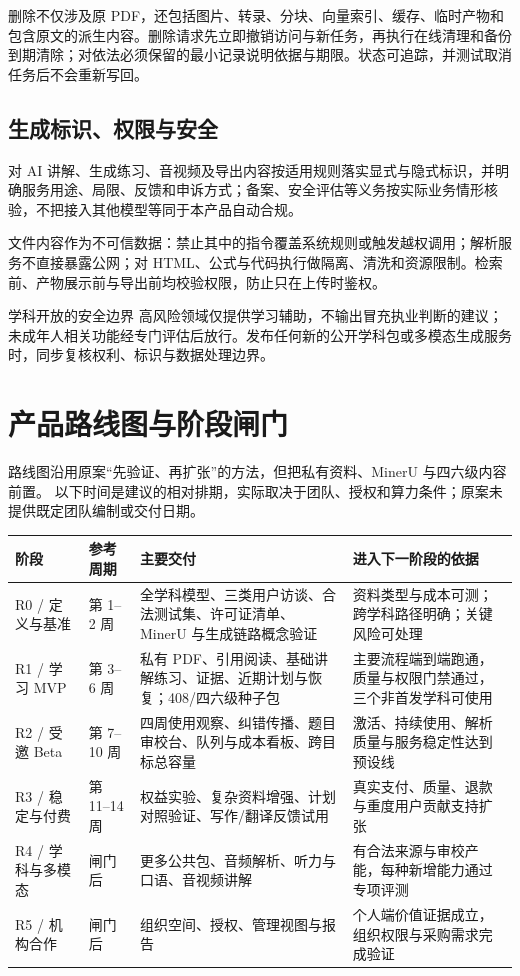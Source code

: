 \documentclass[UTF8,a4paper,11pt,fontset=none]{ctexart}
\newcommand{\cth}[1]{\textbf{\sffamily #1}}
\newcommand{\newsec}[1]{\clearpage\section{#1}}
\newenvironment{tbl}{\par\vspace{3pt}\small\noindent\ignorespaces}{\unskip\par\vspace{5pt}}
\begin{document}
删除不仅涉及原 PDF，还包括图片、转录、分块、向量索引、缓存、临时产物和包含原文的派生内容。删除请求先立即撤销访问与新任务，再执行在线清理和备份到期清除；对依法必须保留的最小记录说明依据与期限。状态可追踪，并测试取消任务后不会重新写回。

\subsection{生成标识、权限与安全}
对 AI 讲解、生成练习、音视频及导出内容按适用规则落实显式与隐式标识，并明确服务用途、局限、反馈和申诉方式；备案、安全评估等义务按实际业务情形核验，不把接入其他模型等同于本产品自动合规。\cite{genai,marking}

文件内容作为不可信数据：禁止其中的指令覆盖系统规则或触发越权调用；解析服务不直接暴露公网；对 HTML、公式与代码执行做隔离、清洗和资源限制。检索前、产物展示前与导出前均校验权限，防止只在上传时鉴权。

\begin{caution}{学科开放的安全边界}
高风险领域仅提供学习辅助，不输出冒充执业判断的建议；未成年人相关功能经专门评估后放行。发布任何新的公开学科包或多模态生成服务时，同步复核权利、标识与数据处理边界。
\end{caution}

\newsec{产品路线图与阶段闸门}
路线图沿用原案“先验证、再扩张”的方法，但把私有资料、MinerU 与四六级内容前置。\cite{original} 以下时间是建议的相对排期，实际取决于团队、授权和算力条件；原案未提供既定团队编制或交付日期。

\begin{tbl}
\begin{tabularx}{\linewidth}{@{}L{22mm}L{18mm}YY@{}}
\toprule
\cth{阶段}&\cth{参考周期}&\cth{主要交付}&\cth{进入下一阶段的依据}\\\midrule
R0 / 定义与基准&第 1--2 周&全学科模型、三类用户访谈、合法测试集、许可证清单、MinerU 与生成链路概念验证&资料类型与成本可测；跨学科路径明确；关键风险可处理\\
R1 / 学习 MVP&第 3--6 周&私有 PDF、引用阅读、基础讲解练习、证据、近期计划与恢复；408/四六级种子包&主要流程端到端跑通，质量与权限门禁通过，三个非首发学科可使用\\
R2 / 受邀 Beta&第 7--10 周&四周使用观察、纠错传播、题目审校台、队列与成本看板、跨目标总容量&激活、持续使用、解析质量与服务稳定性达到预设线\\
R3 / 稳定与付费&第 11--14 周&权益实验、复杂资料增强、计划对照验证、写作/翻译反馈试用&真实支付、质量、退款与重度用户贡献支持扩张\\
R4 / 学科与多模态&闸门后&更多公共包、音频解析、听力与口语、音视频讲解&有合法来源与审校产能，每种新增能力通过专项评测\\
R5 / 机构合作&闸门后&组织空间、授权、管理视图与报告&个人端价值证据成立，组织权限与采购需求完成验证\\
\bottomrule
\end{tabularx}
\end{tbl}
\end{document}
